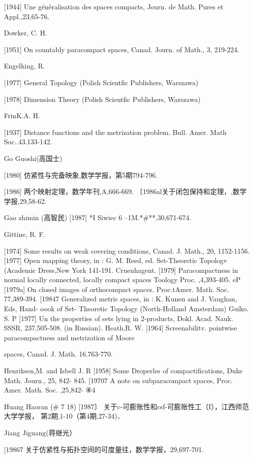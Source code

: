 \documentclass[main.tex]{subfiles}
\begin{document}
[1944] Une généralisation des spaces compacts, Journ. de Math. Pures et Appl.,23,65-76.

\noindent Dowker, C. H.

[1951] On countably paracompact spaces, Canad. Journ. of Math., 3, 219-224.

\noindent Engelking, R.

[1977] General Topology (Polish Scientfic Publishers, Warszawa)

[1978] Dimension Theory (Polish Scientfic Publishers, Warszawa)


\noindent FrinK.A. H.

[1937] Distance functions and the metrization problem. Bull. Amer. Math
Soc..43.133-142.

\noindent Go Guoshi(高国士)

[1980] 仿紧性与完备映象,数学学报，第5期794-796.

[1986] 两个映射定理，数学年刊,A,666-669.
〔1986al关于闭包保持和定理，,数学学报,29,58-62.

\noindent Gao zhimin (高智民)
[1987] *I Siwiec 6 --1M.*\#**,30,671-674.

\noindent Gittine, R. F.

[1974]
Some results on weak covering conditions, Canad. J. Math., 20,
1152-1156.
[1977]
Open mapping theory, in : G. M. Reed, ed. Set-Theoretic Topologv
(Academic Dress,New York 141-191.
Cruenhagent.
[1979]
Paracompactness in normal locally connected,
locally compact
spaces Toology Proc.
,4,393-405.
eP [1979a]
On closed images of orthocompact
spaces. Proc.tAmer. Math. Soc.
77,389-394.
[19847 Generalized metric spaces, in : K. Kunen and J. Vaughan, Eds, Hand-
oook of Set- Theoretic Topology (North-Holland Amsterdam)
Guíko. S. P
[1977]
Un
the properties of sets lying in 2-products, Dokl. Acad. Nauk.
SSSR, 237,505-508. (in Russian).
Heath,R. W.
[1964]
Screenabilitv. pointwise paracompactness and
metrization of Moore

spaces, Canad. J. Math. 16.763-770.

\noindent Henriksen,M. and Isbell J. R
[1958]
Some Droperles
of compactifications, Duke Math. Journ., 25, 842-
845.
[19707 A note on subparacompact spaces, Proc. Amer. Math. Soc. ,25,842-
⑧4

\noindent Huang Haoran (# 7 18)
[1987〕 关于c-可膨账性和csf-可膨账性工（I），江西师范大学学报，
第2期,1-10（第4期,27-34)．

\noindent Jiang Jiguang(蒋继光）

[19867 关于仿紧性与拓扑空间的可度量往，数学学报，29,697-701.
\end{document}
